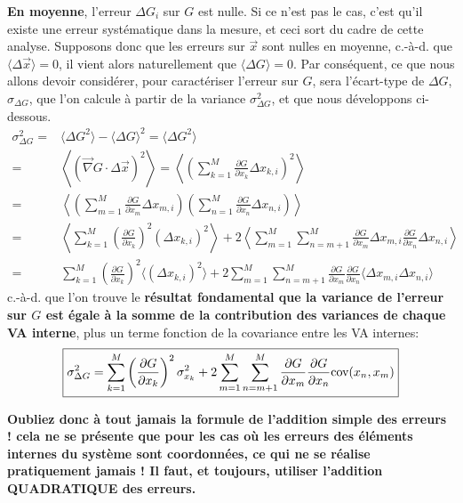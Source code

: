 \textbf{En moyenne}, l'erreur $\Delta G_i$ sur $G$ est nulle. Si ce n'est pas le cas, c'est qu'il existe une erreur systématique dans la mesure, et ceci sort du cadre de cette analyse. Supposons donc que les erreurs sur $\vec{x}$ sont nulles en moyenne, c.-à-d. que $\langle\Delta\vec{x}\rangle=0$, il vient alors naturellement que $\langle\Delta G\rangle=0$. Par conséquent, ce que nous allons devoir considérer, pour caractériser l'erreur sur $G$, sera l'écart-type de  $\Delta G$, $\sigma_{\Delta G}$, que l'on calcule à partir de la variance $\sigma_{\Delta G}^2$, et que nous développons ci-dessous.
\begin{align*}
\sigma_{\Delta G}^2=&\langle\Delta G^2\rangle-\langle\Delta G\rangle^2=
\langle\Delta G^2\rangle\\
=&\left\langle\left(\vec{\nabla} G\cdot\Delta\vec{x}\right)^2\right\rangle=\left\langle\left(\sum\limits_{k=1}^{M}\frac{\partial G}{\partial x_k}\Delta x_{k,i}\right)^2\right\rangle\\
=&\left\langle\left(\sum\limits_{m=1}^{M}\frac{\partial G}{\partial x_m}\Delta x_{m,i}\right)\left(\sum\limits_{n=1}^{M}\frac{\partial G}{\partial x_n}\Delta x_{n,i}\right)\right\rangle\\
=&\left\langle\sum\limits_{k=1}^{M}\left(\frac{\partial G}{\partial x_k}\right)^2\left(\Delta x_{k,i}\right)^2\right\rangle+2\left\langle\sum\limits_{m=1}^{M}\sum\limits_{n=m+1}^{M}\frac{\partial G}{\partial x_m}\Delta x_{m,i}\frac{\partial G}{\partial x_n}\Delta x_{n,i}\right\rangle\\
=&\sum\limits_{k=1}^{M}\left(\frac{\partial G}{\partial x_k}\right)^2\langle\left(\Delta x_{k,i}\right)^2\rangle+2\sum\limits_{m=1}^{M}\sum\limits_{n=m+1}^{M}\frac{\partial G}{\partial x_m}\frac{\partial G}{\partial x_n}\langle\Delta x_{m,i}\Delta x_{n,i}\rangle
\end{align*}
c.-à-d. que l'on trouve le \textbf{résultat fondamental que la variance de l'erreur sur $G$ est égale à la somme de la contribution des variances de chaque VA interne}, plus un terme fonction de la covariance entre les VA internes:
\begin{equation}
\boxed{\sigma^2_{\Delta G}=\sum\limits_{k=1}^{M}\left(\frac{\partial G}{\partial x_k}\right)^2\sigma_{x_k}^2
+2\sum\limits_{m=1}^{M}\sum\limits_{n=m+1}^{M}\frac{\partial G}{\partial x_m}\frac{\partial G}{\partial x_n}\text{cov}(x_n,x_m)}
\label{eq:sdg2}
\end{equation}

\begin{center}
\bf Oubliez donc à tout jamais la formule de l'addition simple des erreurs ! cela ne se présente que pour les cas où les erreurs des éléments internes du système sont coordonnées, ce qui ne se réalise pratiquement jamais ! Il faut, et toujours, utiliser l'addition QUADRATIQUE des erreurs.
\end{center}


